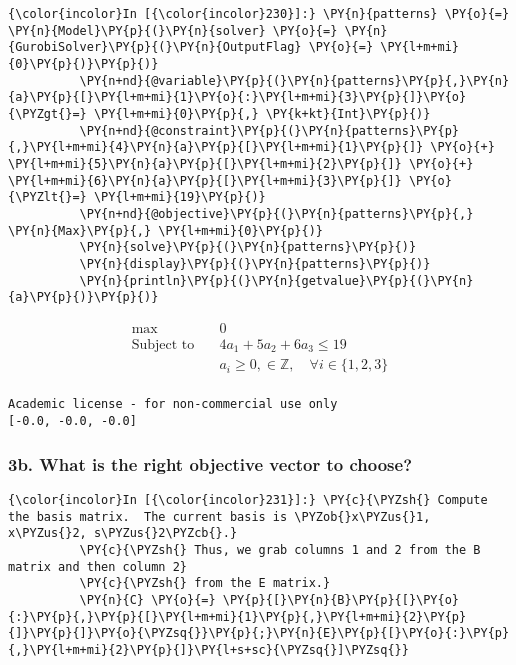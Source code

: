     \begin{Verbatim}[commandchars=\\\{\}]
{\color{incolor}In [{\color{incolor}230}]:} \PY{n}{patterns} \PY{o}{=} \PY{n}{Model}\PY{p}{(}\PY{n}{solver} \PY{o}{=} \PY{n}{GurobiSolver}\PY{p}{(}\PY{n}{OutputFlag} \PY{o}{=} \PY{l+m+mi}{0}\PY{p}{)}\PY{p}{)}
          \PY{n+nd}{@variable}\PY{p}{(}\PY{n}{patterns}\PY{p}{,}\PY{n}{a}\PY{p}{[}\PY{l+m+mi}{1}\PY{o}{:}\PY{l+m+mi}{3}\PY{p}{]}\PY{o}{\PYZgt{}=} \PY{l+m+mi}{0}\PY{p}{,} \PY{k+kt}{Int}\PY{p}{)}
          \PY{n+nd}{@constraint}\PY{p}{(}\PY{n}{patterns}\PY{p}{,}\PY{l+m+mi}{4}\PY{n}{a}\PY{p}{[}\PY{l+m+mi}{1}\PY{p}{]} \PY{o}{+} \PY{l+m+mi}{5}\PY{n}{a}\PY{p}{[}\PY{l+m+mi}{2}\PY{p}{]} \PY{o}{+} \PY{l+m+mi}{6}\PY{n}{a}\PY{p}{[}\PY{l+m+mi}{3}\PY{p}{]} \PY{o}{\PYZlt{}=} \PY{l+m+mi}{19}\PY{p}{)}
          \PY{n+nd}{@objective}\PY{p}{(}\PY{n}{patterns}\PY{p}{,} \PY{n}{Max}\PY{p}{,} \PY{l+m+mi}{0}\PY{p}{)}
          \PY{n}{solve}\PY{p}{(}\PY{n}{patterns}\PY{p}{)}
          \PY{n}{display}\PY{p}{(}\PY{n}{patterns}\PY{p}{)}
          \PY{n}{println}\PY{p}{(}\PY{n}{getvalue}\PY{p}{(}\PY{n}{a}\PY{p}{)}\PY{p}{)}
\end{Verbatim}


\begin{equation} \begin{split}\max\quad & 0\\
\text{Subject to} \quad & 4 a_{1} + 5 a_{2} + 6 a_{3} \leq 19\\
 & a_{i} \geq 0, \in \mathbb{Z}, \quad\forall i \in \{1,2,3\}\\
\end{split}
\end{equation}

    
    \begin{Verbatim}[commandchars=\\\{\}]
Academic license - for non-commercial use only
[-0.0, -0.0, -0.0]

    \end{Verbatim}

    \hypertarget{b.-what-is-the-right-objective-vector-to-choose}{%
\subsubsection{3b. What is the right objective vector to
choose?}\label{b.-what-is-the-right-objective-vector-to-choose}}

    \begin{Verbatim}[commandchars=\\\{\}]
{\color{incolor}In [{\color{incolor}231}]:} \PY{c}{\PYZsh{} Compute the basis matrix.  The current basis is \PYZob{}x\PYZus{}1, x\PYZus{}2, s\PYZus{}2\PYZcb{}.}
          \PY{c}{\PYZsh{} Thus, we grab columns 1 and 2 from the B matrix and then column 2}
          \PY{c}{\PYZsh{} from the E matrix.}
          \PY{n}{C} \PY{o}{=} \PY{p}{[}\PY{n}{B}\PY{p}{[}\PY{o}{:}\PY{p}{,}\PY{p}{[}\PY{l+m+mi}{1}\PY{p}{,}\PY{l+m+mi}{2}\PY{p}{]}\PY{p}{]}\PY{o}{\PYZsq{}}\PY{p}{;}\PY{n}{E}\PY{p}{[}\PY{o}{:}\PY{p}{,}\PY{l+m+mi}{2}\PY{p}{]}\PY{l+s+sc}{\PYZsq{}]\PYZsq{}}
\end{Verbatim}



